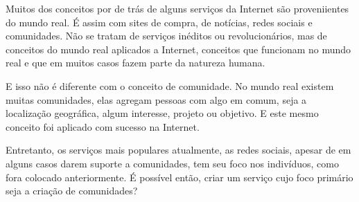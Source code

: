 \documentclass[diss]{template/setrem}
\begin{document}
Muitos dos conceitos por de trás de alguns serviços da Internet são proveniientes do mundo real. É assim com sites de compra, de notícias, redes sociais e comunidades. Não se tratam de serviços inéditos ou revolucionários, mas de conceitos do mundo real aplicados a Internet, conceitos que funcionam no mundo real e que em muitos casos fazem parte da natureza humana.

E isso não é diferente com o conceito de comunidade. No mundo real existem muitas comunidades, elas agregam pessoas com algo em comum, seja a localização geográfica, algum interesse, projeto ou objetivo. E este mesmo conceito foi aplicado com sucesso na Internet.

Entretanto, os serviços mais populares atualmente, as redes sociais, apesar de em alguns casos darem suporte a comunidades, tem seu foco nos indivíduos, como fora colocado anteriormente. É possível então, criar um serviço cujo foco primário seja a criação de comunidades?






\end{document}
